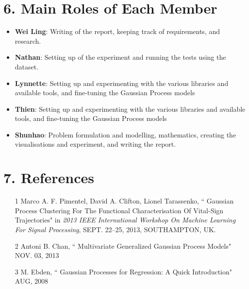 \documentclass[letterpaper]{article}
\begin{document}
\section{6. Main Roles of Each Member}
\begin{itemize}
\item \textbf{Wei Ling}: 
Writing of the report, keeping track of requirements, and research.
\item \textbf{Nathan}: 
Setting up of the experiment and running the tests using the dataset.
\item \textbf{Lynnette}: 
Setting up and experimenting with the various libraries and available tools, and fine-tuning the Gaussian Process models
\item \textbf{Thien}: 
Setting up and experimenting with the various libraries and available tools, and fine-tuning the Gaussian Process models
\item \textbf{Shunhao}: 
Problem formulation and modelling, mathematics, creating the visualisations and experiment, and writing the report.
\end{itemize}

\section{7.  References}

\begin{itemize}
\item
[1] Marco A. F. Pimentel, David A. Clifton, Lionel Tarassenko, `` Gaussian Process Clustering For The Functional Characterisation Of Vital-Sign Trajectories" in {\it 2013 IEEE International Workshop On Machine Learning For Signal Processing}, SEPT. 22–25, 2013, SOUTHAMPTON, UK. \\
\item
[2] Antoni B. Chan, ``{ Multivariate Generalized Gaussian Process Models}" NOV. 03, 2013 \\
\item
[3] M. Ebden, ``{ Gaussian Processes for Regression: A Quick Introduction}" AUG, 2008 \\
\end{itemize}
\end{document}
